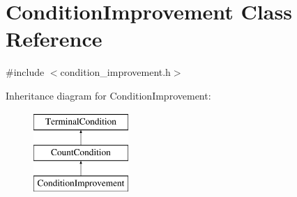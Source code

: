 \hypertarget{class_condition_improvement}{}\section{Condition\+Improvement Class Reference}
\label{class_condition_improvement}


{\ttfamily \#include $<$condition\+\_\+improvement.\+h$>$}

Inheritance diagram for Condition\+Improvement\+:\begin{figure}[H]
\begin{center}
\leavevmode
\includegraphics[height=3.000000cm]{class_condition_improvement}
\end{center}
\end{figure}
